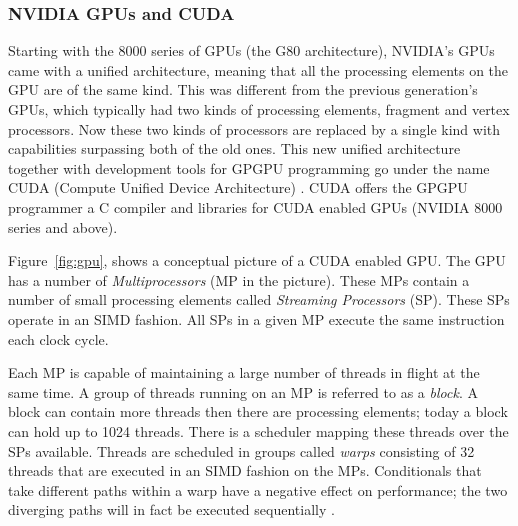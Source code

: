 \subsubsection{NVIDIA GPUs and CUDA}


Starting with the 8000 series of GPUs (the G80 architecture), NVIDIA's 
GPUs came with a unified architecture, meaning that all the 
processing elements on the GPU are of the same kind. This was different from 
the previous generation's GPUs, which typically had two kinds of 
processing elements, fragment and vertex processors.  
Now these two kinds 
of processors are replaced by a single kind with capabilities surpassing both 
of the old ones. This new unified architecture together with development tools 
for GPGPU programming go under the 
name CUDA (Compute Unified Device Architecture) 
\cite{CUDAGuide2.0}. CUDA offers the GPGPU programmer a C %
compiler and libraries for CUDA enabled GPUs (NVIDIA 8000 series and above).  

Figure~\ref{fig:gpu}, shows a conceptual picture of a CUDA enabled GPU. The GPU 
has a number of {\em Multiprocessors} (MP in the picture). These MPs contain 
a number of small processing elements called {\em Streaming Processors} (SP). 
These SPs operate in an SIMD fashion. All SPs in a given MP execute 
the same instruction each clock cycle. 

Each MP is capable of maintaining a large number of threads in flight at the 
same time. A group of threads running on an MP is referred to as a {\em block}. 
A block can contain more threads then there are processing elements; today a 
block can hold up to 1024 threads. There is a scheduler mapping these threads 
over the SPs available. Threads are scheduled in groups called {\em warps} 
consisting of 32 threads that are executed in an SIMD fashion on the MPs.
Conditionals that take different paths within a warp have a negative effect 
on performance; the two diverging paths will in fact be executed sequentially 
\cite{BestPrac}.




